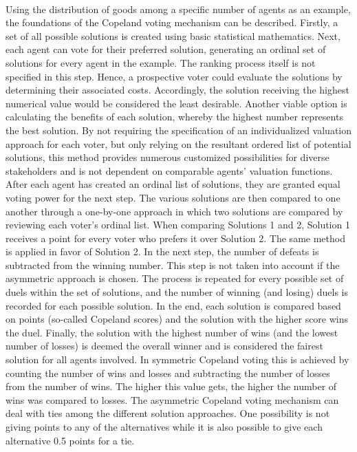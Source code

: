 \documentclass[german, a4paper, 11pt, oneside]{scrbook}
\begin{document}
\\Using the distribution of goods among a specific number of agents as an example, the foundations of the Copeland voting mechanism can be described.  Firstly, a set of all possible solutions is created using basic statistical mathematics. Next, each agent can vote for their preferred solution, generating an ordinal set of solutions for every agent in the example. The ranking process itself is not specified in this step. Hence, a prospective voter could evaluate the solutions by determining their associated costs. Accordingly, the solution receiving the highest numerical value would be considered the least desirable. Another viable option is calculating the benefits of each solution, whereby the highest number represents the best solution. By not requiring the specification of an individualized valuation approach for each voter, but only relying on the resultant ordered list of potential solutions, this method provides numerous customized possibilities for diverse stakeholders and is not dependent on comparable agents' valuation functions. \cite{Bhavnani.2022b} After each agent has created an ordinal list of solutions, they are granted equal voting power for the next step. The various solutions are then compared to one another through a one-by-one approach in which two solutions are compared by reviewing each voter's ordinal list. \cite{Bhavnani.2022b, Brandt} When comparing Solutions 1 and 2, Solution 1 receives a point for every voter who prefers it over Solution 2. The same method is applied in favor of Solution 2. In the next step, the number of defeats is subtracted from the winning number. This step is not taken into account if the asymmetric approach is chosen. The process is repeated for every possible set of duels within the set of solutions, and the number of winning (and losing) duels is recorded for each possible solution.  In the end, each solution is compared based on points (so-called Copeland scores) and the solution with the higher score wins the duel. Finally, the solution with the highest number of wins (and the lowest number of losses) is deemed the overall winner and is considered the fairest solution for all agents involved. In symmetric Copeland voting this is achieved by counting the number of wins and losses and subtracting the number of losses from the number of wins. The higher this value gets, the higher the number of wins was compared to losses. \cite{Bhavnani.2022b,Ek, Brandt}
The asymmetric Copeland voting mechanism can deal with ties among the different solution approaches. One possibility is not giving points to any of the alternatives while it is also possible to give each alternative 0.5 points for a tie. \cite{Brandt}
\end{document}
